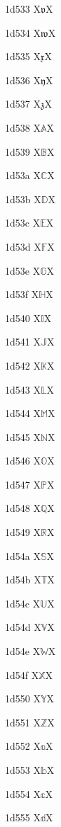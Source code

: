 \documentclass[11pt]{article}
\begin{document}
1d533 X{\ensuremath{\mathfrak{v}}}X

1d534 X{\ensuremath{\mathfrak{w}}}X

1d535 X{\ensuremath{\mathfrak{x}}}X

1d536 X{\ensuremath{\mathfrak{y}}}X

1d537 X{\ensuremath{\mathfrak{z}}}X

1d538 X{\ensuremath{\mathbb{A}}}X

1d539 X{\ensuremath{\mathbb{B}}}X

1d53a X{\ensuremath{\mathbb{C}}}X

1d53b X{\ensuremath{\mathbb{D}}}X

1d53c X{\ensuremath{\mathbb{E}}}X

1d53d X{\ensuremath{\mathbb{F}}}X

1d53e X{\ensuremath{\mathbb{G}}}X

1d53f X{\ensuremath{\mathbb{H}}}X

1d540 X{\ensuremath{\mathbb{I}}}X

1d541 X{\ensuremath{\mathbb{J}}}X

1d542 X{\ensuremath{\mathbb{K}}}X

1d543 X{\ensuremath{\mathbb{L}}}X

1d544 X{\ensuremath{\mathbb{M}}}X

1d545 X{\ensuremath{\mathbb{N}}}X

1d546 X{\ensuremath{\mathbb{O}}}X

1d547 X{\ensuremath{\mathbb{P}}}X

1d548 X{\ensuremath{\mathbb{Q}}}X

1d549 X{\ensuremath{\mathbb{R}}}X

1d54a X{\ensuremath{\mathbb{S}}}X

1d54b X{\ensuremath{\mathbb{T}}}X

1d54c X{\ensuremath{\mathbb{U}}}X

1d54d X{\ensuremath{\mathbb{V}}}X

1d54e X{\ensuremath{\mathbb{W}}}X

1d54f X{\ensuremath{\mathbb{X}}}X

1d550 X{\ensuremath{\mathbb{Y}}}X

1d551 X{\ensuremath{\mathbb{Z}}}X

1d552 X{\ensuremath{\mathbb{a}}}X

1d553 X{\ensuremath{\mathbb{b}}}X

1d554 X{\ensuremath{\mathbb{c}}}X

1d555 X{\ensuremath{\mathbb{d}}}X
\end{document}
